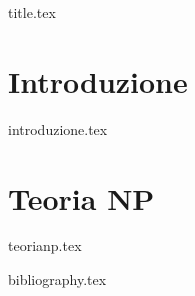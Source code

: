 \documentclass[a4paper,11pt,oneside]{book}
\begin{document}
\frontmatter

{title.tex}

\tableofcontents

\mainmatter


\chapter{Introduzione}
{introduzione.tex}

\chapter{Teoria NP}
{teorianp.tex}

\cleardoublepage

{bibliography.tex}
\end{document}
